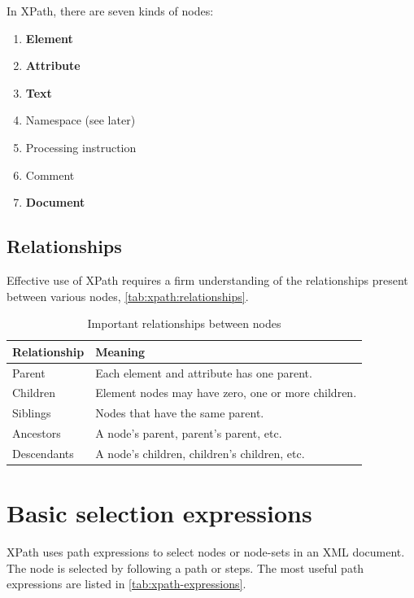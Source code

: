 \documentclass{pgnotes}
\begin{document}
In XPath, there are seven kinds of nodes:

\begin{enumerate}
\item \textbf{Element}
\item \textbf{Attribute}
\item \textbf{Text}
\item Namespace (see later)
\item Processing instruction 
\item Comment
\item \textbf{Document}
\end{enumerate}


\subsection{Relationships}

Effective use of XPath requires a firm understanding of the relationships present between various nodes, \autoref{tab:xpath:relationships}.

\begin{table}[htbp]
  \centering
  \begin{tabularx}{1.0\linewidth}{l X}
    \toprule
    \textbf{Relationship} & \textbf{Meaning} \\
    \midrule
    Parent & Each element and attribute has one parent. \\
    Children & Element nodes may have zero, one or more children. \\
    Siblings & Nodes that have the same parent. \\
    Ancestors & A node's parent, parent's parent, etc. \\
    Descendants & A node's children, children's children, etc. \\
    \bottomrule
  \end{tabularx}
  \caption{Important relationships between nodes}
  \label{tab:xpath:relationships} 
\end{table}


\section{Basic selection expressions}

XPath uses path expressions to select nodes or node-sets in an XML document.
The node is selected by following a path or steps.
The most useful path expressions are listed in \autoref{tab:xpath-expressions}.
\end{document}
